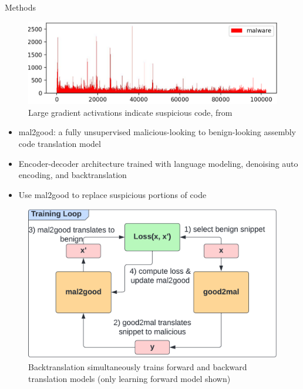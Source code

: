 \documentclass[final,10pt]{beamer}
\newlength{\colwidth}
\begin{document}
\begin{frame}[t]
\begin{columns}[t]
\begin{column}{\colwidth}
\begin{block}{Methods}
		\begin{figure}
			\begin{center}
				\includegraphics[scale=.5]{./figures/Explainability.png}
			\end{center}
			\caption{Large gradient activations indicate suspicious code, from \cite{coull2019activation}}
			\label{fig:ExplainabilityFileOffset}
		\end{figure}

		\begin{itemize}
			\item mal2good: a fully unsupervised malicious-looking to benign-looking assembly code translation model
			\item Encoder-decoder architecture trained with language modeling, denoising auto encoding, and backtranslation
			\item Use mal2good to replace suspicious portions of code
		\end{itemize}
		
		\begin{figure}
			\begin{center}
				\includegraphics[scale=1.25]{./figures/Backtranslation.png}
			\end{center}
			\caption{Backtranslation simultaneously trains forward and backward translation models (only learning forward model shown)}
			\label{fig:Backtranslation}
		\end{figure}
		

\end{block}
\end{column}
\end{columns}
\end{frame}
\end{document}
